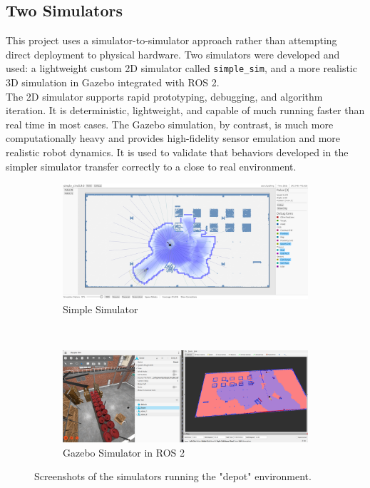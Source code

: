 \subsection{Two Simulators}
This project uses a simulator-to-simulator approach rather than attempting direct deployment to physical hardware. Two simulators were developed and used: a lightweight custom 2D simulator called \texttt{simple\_sim}, and a more realistic 3D simulation in Gazebo integrated with ROS 2. \\

The 2D simulator supports rapid prototyping, debugging, and algorithm iteration. It is deterministic, lightweight, and capable of much running faster than real time in most cases. The Gazebo simulation, by contrast, is much more computationally heavy and provides high-fidelity sensor emulation and more realistic robot dynamics. It is used to validate that behaviors developed in the simpler simulator transfer correctly to a close to real environment. \\

\def\w{0.95\textwidth}
\begin{figure}[h]
    \centering
    \begin{subfigure}[b]{\w}
        \centering
        \includegraphics[width=\textwidth]{./figures/screenshots/simple_sim_depot.png}
        \caption{Simple Simulator}
    \end{subfigure} \\
    \vspace{3mm}
    \begin{subfigure}[b]{\w}
        \centering
        \includegraphics[width=\textwidth]{./figures/screenshots/gazebo_sim_depot.png}
        \caption{Gazebo Simulator in ROS 2}
    \end{subfigure}
    \caption{Screenshots of the simulators running the "depot" environment.}
    \label{fig:simulators}
\end{figure}

